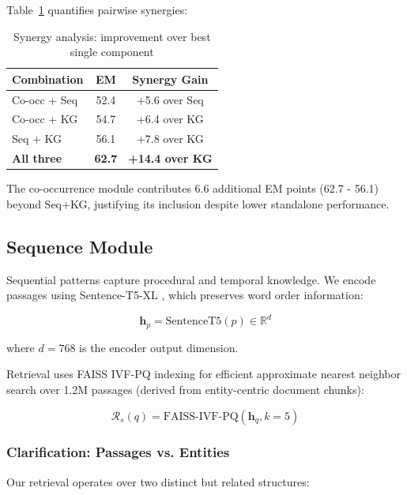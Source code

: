 \documentclass[10pt,twocolumn]{article}
\begin{document}
Table~\ref{tab:synergy} quantifies pairwise synergies:

\begin{table}[h]
\centering
\caption{Synergy analysis: improvement over best single component}
\label{tab:synergy}
\small
\begin{tabular}{@{}lcc@{}}
\toprule
\textbf{Combination} & \textbf{EM} & \textbf{Synergy Gain} \\
\midrule
Co-occ + Seq & 52.4 & +5.6 over Seq \\
Co-occ + KG & 54.7 & +6.4 over KG \\
Seq + KG & 56.1 & +7.8 over KG \\
\textbf{All three} & \textbf{62.7} & \textbf{+14.4 over KG} \\
\bottomrule
\end{tabular}
\end{table}

The co-occurrence module contributes 6.6 additional EM points (62.7 - 56.1) beyond Seq+KG, justifying its inclusion despite lower standalone performance.


\subsection{Sequence Module}

Sequential patterns capture procedural and temporal knowledge. We encode passages using Sentence-T5-XL \cite{ni2022sentence_t5}, which preserves word order information:

\begin{equation}
\mathbf{h}_p = \text{SentenceT5}(p) \in \mathbb{R}^{d}
\end{equation}

where $d=768$ is the encoder output dimension.

Retrieval uses FAISS IVF-PQ indexing \cite{johnson2019faiss} for efficient approximate nearest neighbor search over 1.2M passages (derived from entity-centric document chunks):

\begin{equation}
\mathcal{R}_s(q) = \text{FAISS-IVF-PQ}(\mathbf{h}_q, k=5)
\end{equation}

\subsubsection{Clarification: Passages vs. Entities}
\label{sec:passages_entities}

Our retrieval operates over two distinct but related structures:
\end{document}
